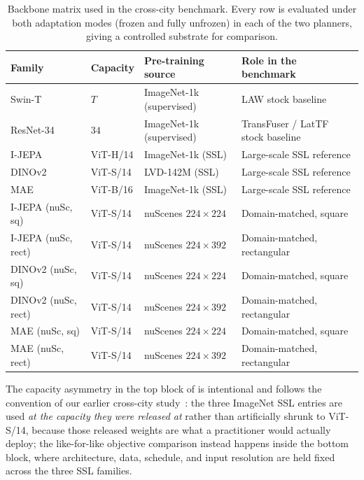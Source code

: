 \begin{table}[ht]
\centering
\caption{Backbone matrix used in the cross-city benchmark. Every row is evaluated under both adaptation modes (frozen and fully unfrozen) in each of the two planners, giving a controlled substrate for comparison.}
\label{tab:meth-phase1-backbones}
\small
\renewcommand{\arraystretch}{1.2}
\setlength{\tabcolsep}{5pt}
\begin{tabular}{@{}>{\raggedright\arraybackslash}p{3.0cm} >{\raggedright\arraybackslash}p{2.3cm} >{\raggedright\arraybackslash}p{2.7cm} >{\raggedright\arraybackslash}p{3.9cm}@{}}
\toprule
\textbf{Family} & \textbf{Capacity} & \textbf{Pre-training source} & \textbf{Role in the benchmark} \\
\midrule
Swin-T~\cite{liu-swin-2021}         & $T$        & ImageNet-1k (supervised) & LAW stock baseline \\
ResNet-34~\cite{he-resnet-2016}     & $34$       & ImageNet-1k (supervised) & TransFuser / LatTF stock baseline \\
I-JEPA~\cite{assran-ijepa-2023}     & ViT-H/14   & ImageNet-1k (SSL)         & Large-scale SSL reference \\
DINOv2~\cite{oquab-dinov2-2024}     & ViT-S/14   & LVD-142M (SSL)            & Large-scale SSL reference \\
MAE~\cite{he-mae-2022}              & ViT-B/16   & ImageNet-1k (SSL)         & Large-scale SSL reference \\
\midrule
I-JEPA (nuSc, sq) & ViT-S/14 & nuScenes $224{\times}224$ & Domain-matched, square \\
I-JEPA (nuSc, rect) & ViT-S/14 & nuScenes $224{\times}392$ & Domain-matched, rectangular \\
DINOv2 (nuSc, sq) & ViT-S/14 & nuScenes $224{\times}224$ & Domain-matched, square \\
DINOv2 (nuSc, rect) & ViT-S/14 & nuScenes $224{\times}392$ & Domain-matched, rectangular \\
MAE (nuSc, sq) & ViT-S/14 & nuScenes $224{\times}224$ & Domain-matched, square \\
MAE (nuSc, rect) & ViT-S/14 & nuScenes $224{\times}392$ & Domain-matched, rectangular \\
\bottomrule
\end{tabular}
\end{table}

The capacity asymmetry in the top block of  is intentional and follows the convention of our earlier cross-city study~\cite{naeinian-cross-city-2026}: the three ImageNet SSL entries are used \emph{at the capacity they were released at} rather than artificially shrunk to ViT-S/14, because those released weights are what a practitioner would actually deploy; the like-for-like objective comparison instead happens inside the bottom block, where architecture, data, schedule, and input resolution are held fixed across the three SSL families.

